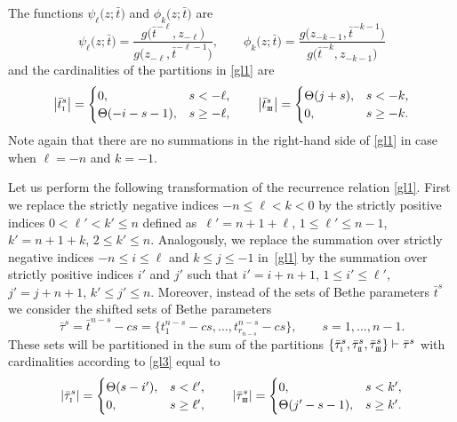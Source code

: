 \documentclass[10pt,a4paper]{amsart}
\newcommand{\so}{\scriptscriptstyle \rm I}
\newcommand{\st}{\scriptscriptstyle \rm I\hspace{-1pt}I}
\newcommand{\sth}{\scriptscriptstyle \rm I\hspace{-1pt}I\hspace{-1pt}I}
\newcommand{\bt}{{\bar t}}
\newcommand{\btt}{{\bar\tau}}
\theoremstyle{definition}
\def\r#1{\eqref{#1}}
\def\lp{{\ell'}}
\def\kp{{k'}}
\def\ip{{i'}}
\def\jp{{j'}}
\begin{document}
The functions
$\psi_\ell\bigl(z;\bt\bigr)$ and $\phi_k\bigl(z;\bt\bigr)$ are
\[%
\psi_\ell\bigl(z;\bt\bigr)=\frac{g\bigl(\bt^{-\ell},z_{-\ell}\bigr)}{g\bigl(z_{-\ell},\bt^{-\ell-1}\bigr)},\qquad
\phi_k\bigl(z;\bt\bigr)=\frac{g\bigl(z_{-k-1},\bt^{-k-1}\bigr)}{g\bigl(\bt^{-k},z_{-k-1}\bigr)}
\]
and the cardinalities of the partitions in \r{gl1} are
\begin{equation}\label{gl3}
\big|\bt^s_{\so}\big|=\begin{cases}
0, &s<-\ell,\\
\Theta(-i-s-1), &s\geq -\ell,
\end{cases}\qquad
\big|\bt^s_{\sth}\big|=\begin{cases}
\Theta(j+s), &s<-k,\\
0, &s\geq -k.
\end{cases}
\end{equation}
Note again that there are no summations in the right-hand side of \r{gl1}
in case when $\ell=-n$ and $k=-1$.


Let us perform the following transformation of the recurrence relation
\r{gl1}. First we replace the strictly negative indices $-n\leq \ell<k<0$
by the strictly positive indices $0<\lp<\kp\leq n$ defined as~${
\lp=n+1+\ell}$, $ 1\leq\lp\leq n-1$, $ \kp=n+1+k$, $ 2\leq\kp\leq n$.
Analogously, we replace the summation over strictly negative
indices $-n\leq i\leq \ell$ and $k\leq j\leq -1$ in~\r{gl1} by the summation
over strictly positive indices $\ip$ and $\jp$ such that
$
\ip=i+n+1$, $ 1\leq \ip\leq \lp$, $ \jp=j+n+1$, $ \kp\leq\jp\leq n $.
Moreover, instead of the sets of Bethe parameters $\bt^s$ we consider
the shifted sets of Bethe parameters
\begin{equation}\label{gl10}
\btt^s=\bt^{ n-s}-c s=
\bigl\{t^{ n-s}_1-c s,\dots,t^{ n-s}_{r_{n-s}}-c s\bigr\},\qquad s=1,\dots,n-1 .
\end{equation}
These sets will be partitioned in the sum of the partitions
$\{\btt^s_{\so},\btt^s_{\st},\btt^s_{\sth}\}\vdash \btt^s$ with cardinalities
according to \r{gl3} equal to
\[%
|\btt^s_{\so}|=\begin{cases}
\Theta(s-\ip), &s<\lp,\\
0, &s\geq \lp,
\end{cases}\qquad
|\btt^s_{\sth}|=\begin{cases}
0, &s<\kp,\\
\Theta(\jp-s-1), &s\geq \kp.
\end{cases}
\]
\end{document}
